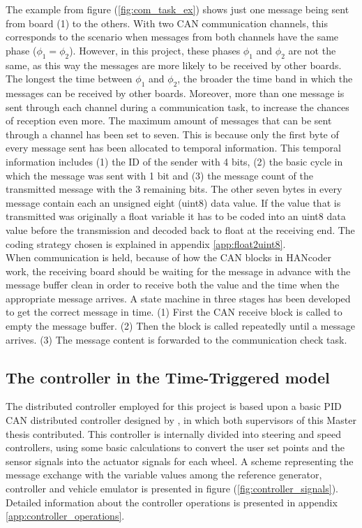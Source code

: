 \documentclass[table,xcdraw]{article}
\begin{document}
The example from figure (\ref{fig:com_task_ex}) shows just one message being sent from board (1) to the others. With two CAN communication channels, this corresponds to the scenario when messages from both channels have the same phase ($\phi_1 = \phi_2$). However, in this project, these phases $\phi_1$ and $\phi_2$ are not the same, as this way the messages are more likely to be received by other boards. The longest the time between $\phi_1$ and $\phi_2$, the broader the time band in which the messages can be received by other boards. Moreover, more than one message is sent through each channel during a communication task, to increase the chances of reception even more. The maximum amount of messages that can be sent through a channel has been set to seven. This is because only the first byte of every message sent has been allocated to temporal information. This temporal information includes (1) the ID of the sender with 4 bits, (2) the basic cycle in which the message was sent with 1 bit and (3) the message count of the transmitted message with the 3 remaining bits. The other seven bytes in every message contain each an unsigned eight (uint8) data value. If the value that is transmitted was originally a float variable it has to be coded into an uint8 data value before the transmission and decoded back to float at the receiving end. The coding strategy chosen is explained in appendix \ref{app:float2uint8}.\\

When communication is held, because of how the CAN blocks in HANcoder work, the receiving board should be waiting for the message in advance with the message buffer clean in order to receive both the value and the time when the appropriate message arrives. A state machine in three stages has been developed to get the correct message in time. (1) First the CAN receive block is called to empty the message buffer. (2) Then the block is called repeatedly until a message arrives. (3) The message content is forwarded to the communication check task.

\subsection{The controller in the Time-Triggered model} \label{sec:controller_in_TT_model}
The distributed controller employed for this project is based upon a basic PID CAN distributed controller designed by \citep{former_model}, in which both supervisors of this Master thesis contributed. This controller is internally divided into steering and speed controllers, using some basic calculations to convert the user set points and the sensor signals into the actuator signals for each wheel. A scheme representing the message exchange with the variable values among the reference generator, controller and vehicle emulator is presented in figure (\ref{fig:controller_signals}). Detailed information about the controller operations is presented in appendix \ref{app:controller_operations}.\\
\end{document}
